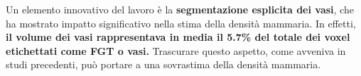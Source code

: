 Un elemento innovativo del lavoro è la \textbf{segmentazione esplicita dei vasi}, che ha mostrato impatto significativo nella stima della densità mammaria. In effetti, \textbf{il volume dei vasi rappresentava in media il 5.7\% del totale dei voxel etichettati come FGT o vasi.} Trascurare questo aspetto, come avveniva in studi precedenti, può portare a una sovrastima della densità mammaria.



